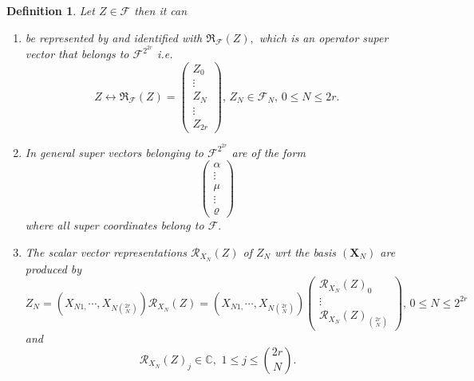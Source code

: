 \documentclass[aps,preprint]{revtex4}
\newtheorem{definition}[theorem]{Definition}
\begin{document}
\begin{definition}
Let $Z\in \mathcal{F}$ then it can

\begin{enumerate}
\item be represented by and identified with $\mathfrak{R}_{\mathcal{F}%
}\left( Z\right) ,$ which is an operator super vector that belongs to $%
\mathcal{F}^{2^{2r}}$ i.e. 
\begin{equation}
Z\leftrightarrow \mathfrak{R}_{\mathcal{F}}\left( Z\right) =\left( 
\begin{array}{c}
Z_{0} \\ 
\vdots \\ 
Z_{N} \\ 
\vdots \\ 
Z_{2r}%
\end{array}%
\right) ,\,Z_{N}\in \mathcal{F}_{N},\,0\leq N\leq 2r.
\end{equation}

\item In general super vectors belonging to $\mathcal{F}^{2^{2r}}$ are of
the form 
\begin{equation}
\left( 
\begin{array}{c}
\alpha \\ 
\vdots \\ 
\mu \\ 
\vdots \\ 
\varrho%
\end{array}%
\right)
\end{equation}%
where all super coordinates belong to $\mathcal{F}.$

\item The scalar vector representations $\mathcal{R}_{X_{N}}\left( Z\right) $
of $Z_{N}$ wrt the basis $\left( \boldsymbol{X}_{N}\right) $ are produced by 
\begin{equation}
Z_{N}=\left( X_{N1,}\cdots ,X_{N\binom{2r}{N}}\right) \mathcal{R}%
_{X_{N}}\left( Z\right) =\left( X_{N1,}\cdots ,X_{N\binom{2r}{N}}\right)
\left( 
\begin{array}{c}
\mathcal{R}_{X_{N}}\left( Z\right) _{0} \\ 
\vdots \\ 
\mathcal{R}_{X_{N}}\left( Z\right) _{\binom{2r}{N}}%
\end{array}%
\right) ,\,0\leq N\leq 2^{2r}
\end{equation}%
and 
\begin{equation}
\,\mathcal{R}_{X_{N}}\left( Z\right) _{j}\in \mathbb{C},\,\,1\leq j\leq 
\binom{2r}{N}.
\end{equation}
\end{enumerate}
\end{definition}
\end{document}

